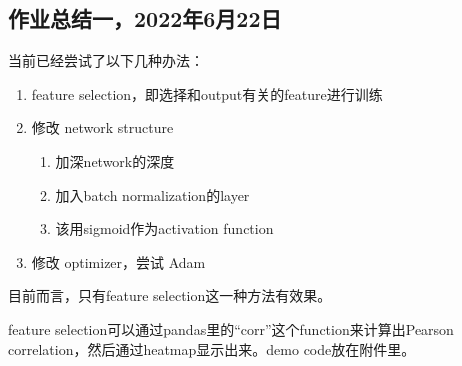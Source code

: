 \documentclass{article}
\begin{document}
\begin{CJK}{UTF8}{gbsn}

\section{作业总结一，2022年6月22日}

当前已经尝试了以下几种办法：
\begin{enumerate}
	\item feature selection，即选择和output有关的feature进行训练
	\item 修改 network structure
	\begin{enumerate}
		\item 加深network的深度
		\item 加入batch normalization的layer
		\item 该用sigmoid作为activation function
	\end{enumerate}
	\item 修改 optimizer，尝试 Adam
\end{enumerate}

目前而言，只有feature selection这一种方法有效果。

feature selection可以通过pandas里的``corr''这个function来计算出Pearson correlation，然后通过heatmap显示出来。demo code放在附件里。

\end{CJK}
\end{document}
